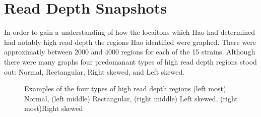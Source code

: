 \documentclass[12pt]{article}
\begin{document}
\section{Read Depth Snapshots}
	In order to gain a understanding of how the locaitons which Hao had determined had notably high read depth the regions Hao identified were graphed. There were approximatly between 2000 and 4000 regions for each of the 15 strains. Although there were many graphs four predomanant types of high read depth regions stood out: Normal, Rectangular, Right skewed, and Left skewed.
\begin{figure}[H]
	\begin{centering}
		\begin{singlespace}
			\vspace{-0.5cm}
			\caption[Examples of the four types of high read depth regions.]{Examples of the four types of high read depth regions (left most) Normal, (left middle) Rectangular, (right middle) Left skewed, (right most)Right skewed}\label{four_rds}
		\end{singlespace}
	\end{centering}
\end{figure}

%
%
\end{document}
